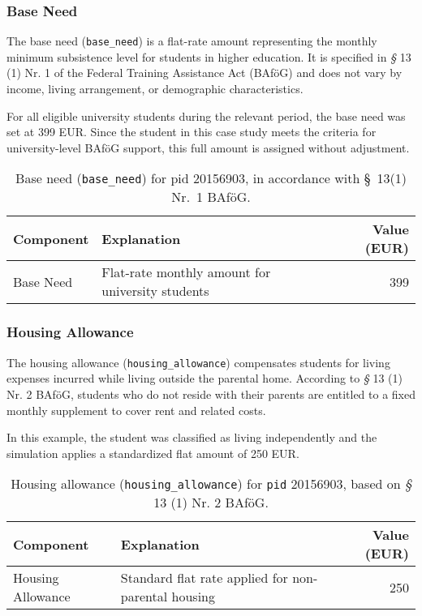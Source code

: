 \subsubsection{Base Need}
The base need (\texttt{base\_need}) is a flat-rate amount representing the monthly minimum subsistence level for students in higher education. 
It is specified in {\textit{§}} 13 (1) Nr. 1 of the Federal Training Assistance Act (BAföG) and does not vary by income, living arrangement, or demographic characteristics.

For all eligible university students during the relevant period, the base need was set at 399 EUR. Since the student in this case study meets the criteria for university-level BAföG support, this full amount is assigned without adjustment.

\begin{table}[H]
\footnotesize
\centering
\begin{tabularx}{\textwidth}{lXr}
\toprule
\textbf{Component} & \textbf{Explanation} & \textbf{Value (EUR)} \\
\midrule
Base Need & Flat-rate monthly amount for university students & 399 \\
\bottomrule
\end{tabularx}
\caption{Base need (\texttt{base\_need}) for pid 20156903, in accordance with §~13(1) Nr.~1 BAföG.}
\label{table:bafoeg_base_need}
\end{table}

\subsubsection{Housing Allowance}
The housing allowance (\texttt{housing\_allowance}) compensates students for living expenses incurred while living outside the parental home. 
According to {\textit{§}} 13 (1) Nr. 2 BAföG, students who do not reside with their parents are entitled to a fixed monthly supplement to cover rent and related costs.

In this example, the student was classified as living independently and the simulation applies a standardized flat amount of 250 EUR.

\begin{table}[H]
\footnotesize
\centering
\begin{tabularx}{\textwidth}{lXr}
\toprule
\textbf{Component} & \textbf{Explanation} & \textbf{Value (EUR)} \\
\midrule
Housing Allowance & Standard flat rate applied for non-parental housing & 250 \\
\bottomrule
\end{tabularx}
\caption{Housing allowance (\texttt{housing\_allowance}) for \texttt{pid} 20156903, based on \textit{§} 13 (1) Nr. 2 BAföG.}
\label{table:bafoeg_housing}
\end{table}

